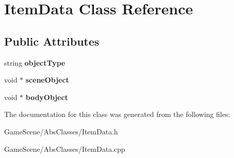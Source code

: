 \hypertarget{classItemData}{}\section{Item\+Data Class Reference}
\label{classItemData}
\subsection*{Public Attributes}
\begin{DoxyCompactItemize}
\item 
string {\bfseries object\+Type}\hypertarget{classItemData_a43c5389381a9741d73e32549129500dc}{}\label{classItemData_a43c5389381a9741d73e32549129500dc}

\item 
void $\ast$ {\bfseries scene\+Object}\hypertarget{classItemData_ab352e8ff54f381c67c6d9d9fff6f1671}{}\label{classItemData_ab352e8ff54f381c67c6d9d9fff6f1671}

\item 
void $\ast$ {\bfseries body\+Object}\hypertarget{classItemData_a2d72daf62224350e9022479954195fe8}{}\label{classItemData_a2d72daf62224350e9022479954195fe8}

\end{DoxyCompactItemize}


The documentation for this class was generated from the following files\+:\begin{DoxyCompactItemize}
\item 
Game\+Scene/\+Abs\+Classes/Item\+Data.\+h\item 
Game\+Scene/\+Abs\+Classes/Item\+Data.\+cpp\end{DoxyCompactItemize}
